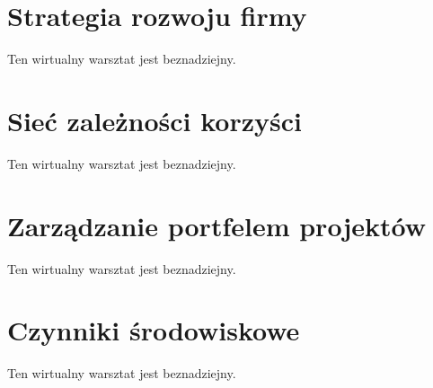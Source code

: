 
\section{Strategia rozwoju firmy}

Ten wirtualny warsztat jest beznadziejny.


\section{Sieć zależności korzyści}

Ten wirtualny warsztat jest beznadziejny.


\section{Zarządzanie portfelem projektów}

Ten wirtualny warsztat jest beznadziejny.


\section{Czynniki środowiskowe}

Ten wirtualny warsztat jest beznadziejny.


